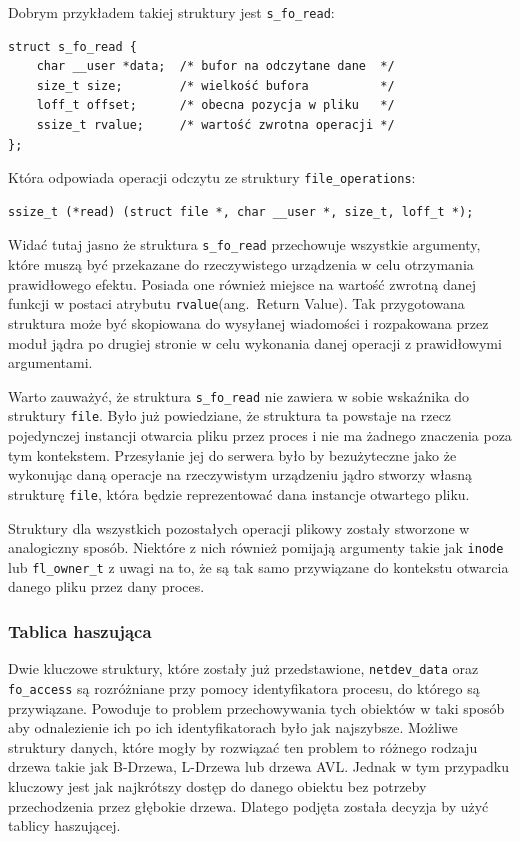 \documentclass[11pt]{scrartcl}
\begin{document}
Dobrym przykładem takiej struktury jest \texttt{s\_fo\_read}:

\begin{verbatim}
struct s_fo_read {
    char __user *data;  /* bufor na odczytane dane  */
    size_t size;        /* wielkość bufora          */
    loff_t offset;      /* obecna pozycja w pliku   */
    ssize_t rvalue;     /* wartość zwrotna operacji */
};
\end{verbatim}

Która odpowiada operacji odczytu ze struktury \texttt{file\_operations}:

\begin{verbatim}
ssize_t (*read) (struct file *, char __user *, size_t, loff_t *);
\end{verbatim}

Widać tutaj jasno że struktura \texttt{s\_fo\_read} przechowuje wszystkie argumenty, które muszą być przekazane do rzeczywistego urządzenia w celu otrzymania prawidłowego efektu. Posiada one również miejsce na wartość zwrotną danej funkcji w postaci atrybutu \texttt{rvalue}(ang.\ Return Value). Tak przygotowana struktura może być skopiowana do wysyłanej wiadomości i rozpakowana przez moduł jądra po drugiej stronie w celu wykonania danej operacji z prawidłowymi argumentami.

Warto zauważyć, że struktura \texttt{s\_fo\_read} nie zawiera w sobie wskaźnika do struktury \texttt{file}. Było już powiedziane, że struktura ta powstaje na rzecz pojedynczej instancji otwarcia pliku przez proces i nie ma żadnego znaczenia poza tym kontekstem. Przesyłanie jej do serwera było by bezużyteczne jako że wykonując daną operacje na rzeczywistym urządzeniu jądro stworzy własną strukturę \texttt{file}, która będzie reprezentować dana instancje otwartego pliku.

Struktury dla wszystkich pozostałych operacji plikowy zostały stworzone w analogiczny sposób. Niektóre z nich również pomijają argumenty takie jak \texttt{inode} lub \texttt{fl\_owner\_t} z uwagi na to, że są tak samo przywiązane do kontekstu otwarcia danego pliku przez dany proces.

\subsubsection{Tablica haszująca}

Dwie kluczowe struktury, które zostały już przedstawione, \texttt{netdev\_data} oraz \texttt{fo\_access} są rozróżniane przy pomocy identyfikatora procesu, do którego są przywiązane. Powoduje to problem przechowywania tych obiektów w taki sposób aby odnalezienie ich po ich identyfikatorach było jak najszybsze. Możliwe struktury danych, które mogły by rozwiązać ten problem to różnego rodzaju drzewa takie jak B-Drzewa, L-Drzewa lub drzewa AVL\@. Jednak w tym przypadku kluczowy jest jak najkrótszy dostęp do danego obiektu bez potrzeby przechodzenia przez głębokie drzewa. Dlatego podjęta została decyzja by użyć tablicy haszującej.
\end{document}
